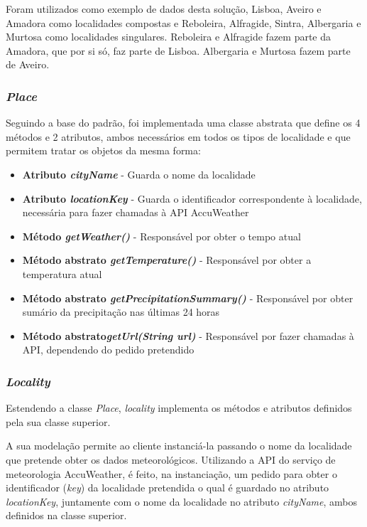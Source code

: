\documentclass[10pt,portuguese]{article}
\begin{document}
\par Foram utilizados como exemplo de dados desta solução, Lisboa, Aveiro e Amadora como localidades compostas e Reboleira, Alfragide, Sintra, Albergaria e Murtosa como localidades singulares. Reboleira e Alfragide fazem parte da Amadora, que por si só, faz parte de Lisboa. Albergaria e Murtosa fazem parte de Aveiro.

\subsubsection{\textit{Place}}

\par Seguindo a base do padrão, foi implementada uma classe abstrata que define os 4 métodos e 2 atributos, ambos necessários em todos os tipos de localidade e que permitem tratar os objetos da mesma forma:

\begin{itemize}
    \item \textbf{Atributo \textit{cityName}} - Guarda o nome da localidade
    \item \textbf{Atributo \textit{locationKey}} - Guarda o identificador correspondente à localidade, necessária para fazer chamadas à API AccuWeather
    \item \textbf{Método \textit{getWeather()}} - Responsável por obter o tempo atual
    \item \textbf{Método abstrato \textit{getTemperature()}} - Responsável por obter a temperatura atual
    \item \textbf{Método abstrato \textit{getPrecipitationSummary()}} - Responsável por obter sumário da precipitação nas últimas 24 horas
    \item \textbf{Método abstrato\textit{getUrl(String url)}} - Responsável por fazer chamadas à API, dependendo do pedido pretendido
\end{itemize}

\subsubsection{\textit{Locality}}

\par Estendendo a classe \textit{Place}, \textit{locality} implementa os métodos e atributos definidos pela sua classe superior.

\par A sua modelação permite ao cliente instanciá-la passando o nome da localidade que pretende obter os dados meteorológicos. Utilizando a API do serviço de meteorologia AccuWeather, é feito, na instanciação, um pedido para obter o identificador (\textit{key}) da localidade pretendida o qual é guardado no atributo \textit{locationKey}, juntamente com o nome da localidade no atributo \textit{cityName}, ambos definidos na classe superior.
\end{document}
